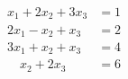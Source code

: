 \begin{align*}
x_1 + 2x_2 + 3x_3 &= 1\\
2x_1 - x_2 + x_3 &= 2\\
3x_1 + x_2 + x_3 &= 4\\
\quad x_2 + 2x_3 &= 6
\end{align*}